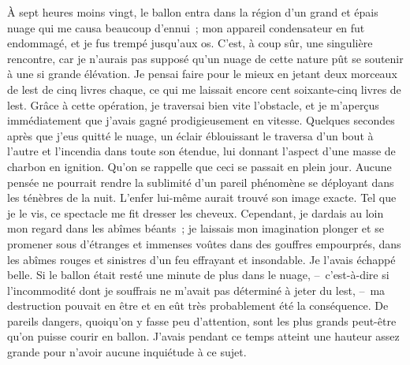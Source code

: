 \documentclass[french,twoside]{book} %
\begin{document}
À sept heures moins vingt, le ballon entra dans la région d’un grand et épais nuage qui me causa beaucoup d’ennui ; mon appareil condensateur en fut endommagé, et je fus trempé jusqu’aux os. C’est, à coup sûr, une singulière rencontre, car je n’aurais pas supposé qu’un nuage de cette nature pût se soutenir à une si grande élévation. Je pensai faire pour le mieux en jetant deux morceaux de lest de cinq livres chaque, ce qui me laissait encore cent soixante-cinq livres de lest. Grâce à cette opération, je traversai bien vite l’obstacle, et je m’aperçus immédiatement que j’avais gagné prodigieusement en vitesse. Quelques secondes après que j’eus quitté le nuage, un éclair éblouissant le traversa d’un bout à l’autre et l’incendia dans toute son étendue, lui donnant l’aspect d’une masse de charbon en ignition. Qu’on se rappelle que ceci se passait en plein jour. Aucune pensée ne pourrait rendre la sublimité d’un pareil phénomène se déployant dans les ténèbres de la nuit. L’enfer lui-même aurait trouvé son image exacte. Tel que je le vis, ce spectacle me fit dresser les cheveux. Cependant, je dardais au loin mon regard dans les abîmes béants ; je laissais mon imagination plonger et se promener sous d’étranges et immenses voûtes dans des gouffres empourprés, dans les abîmes rouges et sinistres d’un feu effrayant et insondable. Je l’avais échappé belle. Si le ballon était resté une minute de plus dans le nuage, – c’est-à-dire si l’incommodité dont je souffrais ne m’avait pas déterminé à jeter du lest, – ma destruction pouvait en être et en eût très probablement été la conséquence. De pareils dangers, quoiqu’on y fasse peu d’attention, sont les plus grands peut-être qu’on puisse courir en ballon. J’avais pendant ce temps atteint une hauteur assez grande pour n’avoir aucune inquiétude à ce sujet.\par
\end{document}
